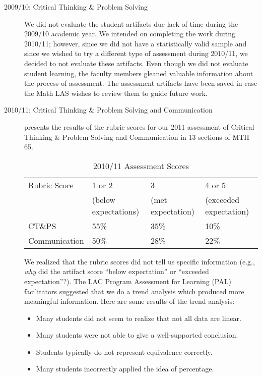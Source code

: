 \begin{description}
\item[2009/10: Critical Thinking \& Problem Solving]
We did not evaluate the student artifacts due lack of time during the 2009/10
academic year. We intended on completing the work during 2010/11; however, since
we did not have a statistically valid sample and since we wished to try a
different type of assessment during 2010/11, we decided to not evaluate these
artifacts.  Even though we did not evaluate student learning, the faculty
members gleaned valuable information about the process of assessment. The
assessment artifacts have been saved in case the Math LAS wishes to review them
to guide future work.
\item[2010/11:  Critical Thinking \& Problem Solving and Communication]
 presents the results of the rubric scores for our
2011 assessment of Critical Thinking \& Problem Solving and Communication in 13
sections of MTH 65.
\begin{table}[!htb]
\centering
\caption{2010/11 Assessment Scores}\label{ass:tab:201011scores}
\begin{tabular}{llll}
\toprule
Rubric Score & 1 or 2 & 3 & 4 or 5\\
&(below expectations)&(met expectation)&(exceeded expectation)\\
\midrule
CT\&PS &55\%&35\%&10\%\\
Communication &50\%&28\%&22\%\\
\bottomrule
\end{tabular}
\end{table}

We realized that the rubric scores did not tell us specific information (e.g.,
\emph{why} did the artifact score ``below expectation'' or ``exceeded
expectation''?).  The LAC Program Assessment for Learning (PAL) facilitators
suggested that we do a trend analysis which produced more meaningful
information. Here are some results of the trend analysis:
\begin{itemize}
\item Many students did not seem to realize that not all data are linear.
\item Many students were not able to give a well-supported conclusion.
\item Students typically do not represent equivalence correctly.
\item Many students incorrectly applied the idea of percentage.
\end{itemize}


\end{description}
